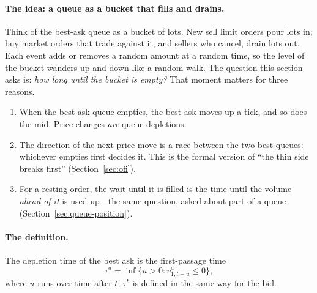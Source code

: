 \paragraph{The idea: a queue as a bucket that fills and drains.} Think of the best-ask queue as a bucket of
lots. New sell limit orders pour lots in; buy market orders that trade against it, and sellers who
cancel, drain lots out. Each event adds or removes a random amount at a random time, so the level of
the bucket wanders up and down like a random walk. The question this section asks is: \emph{how long
until the bucket is empty?} That moment matters for three reasons.
\begin{enumerate}[leftmargin=1.8em,itemsep=1pt]
\item When the best-ask queue empties, the best ask moves up a tick, and so does the mid. Price
  changes \emph{are} queue depletions.
\item The direction of the next price move is a race between the two best queues: whichever empties
  first decides it. This is the formal version of ``the thin side breaks first''
  (Section~\ref{sec:ofi}).
\item For a resting order, the wait until it is filled is the time until the volume \emph{ahead of
  it} is used up---the same question, asked about part of a queue (Section~\ref{sec:queue-position}).
\end{enumerate}

\paragraph{The definition.} The depletion time of the best ask is the first-passage time
\begin{equation}
  \tau^a = \inf\{u > 0 : v^{a}_{1,t+u} \le 0\},
\end{equation}
where $u$ runs over time after $t$; $\tau^b$ is defined in the same way for the bid.

